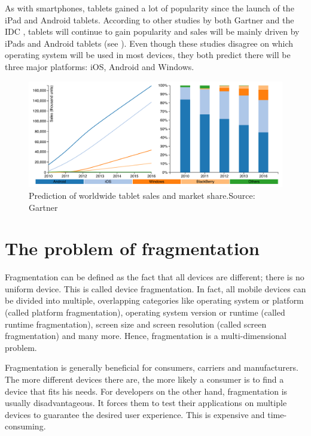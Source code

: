 As with smartphones, tablets gained a lot of popularity since the launch of the iPad and Android tablets. According to other studies by both Gartner \citep{Gartner:11tab,Gartner:12tab} and the IDC \citep{IDC:tablet}, tablets will continue to gain popularity and sales will be mainly driven by iPads and Android tablets (see ). Even though these studies disagree on which operating system will be used in most devices, they both predict there will be three major platforms: iOS, Android and Windows. 

\begin{figure}[h]
    \centering
    \includegraphics[width=\textwidth]{../resources/figs/tablet_sales.pdf}
    \caption{Prediction of worldwide tablet sales and market share.\newline Source: Gartner \citeGartnerTab}
    \label{fig:tablet}
\end{figure}

\section{The problem of fragmentation}

Fragmentation can be defined as the fact that all devices are different; there is no uniform device. This is called device fragmentation. In fact, all mobile devices can be divided into multiple, overlapping categories like operating system or platform (called platform fragmentation), operating system version or runtime (called runtime fragmentation), screen size and screen resolution (called screen fragmentation) and many more. Hence, fragmentation is a multi-dimensional problem. 

Fragmentation is generally beneficial for consumers, carriers and manufacturers. The more different devices there are, the more likely a consumer is to find a device that fits his needs. For developers on the other hand, fragmentation is usually disadvantageous. It forces them to test their applications on multiple devices to guarantee the desired user experience. This is expensive and time-consuming. 

